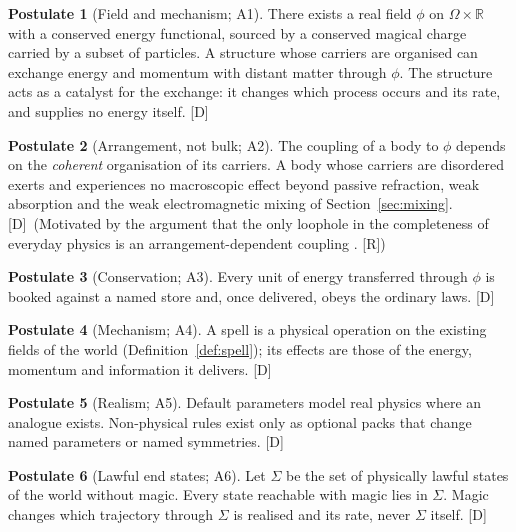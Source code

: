 \documentclass[11pt,a4paper]{article}
\numberwithin{equation}{section}
\theoremstyle{definition}
\newtheorem{postulate}{Postulate}
\theoremstyle{plain}
\theoremstyle{remark}
\newcommand{\R}{\mathbb R}
\newcommand{\tagD}{\textcolor{tag}{\textsf{[D]}}}
\newcommand{\tagR}{\textcolor{tag}{\textsf{[R]}}}
\begin{document}
\begin{postulate}[Field and mechanism; A1]\label{post:field}
There exists a real field $\phi$ on $\Omega\times\R$ with a conserved energy functional, sourced by a conserved magical charge carried by a subset of particles. A structure whose carriers are organised can exchange energy and momentum with distant matter through $\phi$. The structure acts as a catalyst for the exchange: it changes which process occurs and its rate, and supplies no energy itself. \tagD
\end{postulate}

\begin{postulate}[Arrangement, not bulk; A2]\label{post:arrangement}
The coupling of a body to $\phi$ depends on the \emph{coherent} organisation of its carriers. A body whose carriers are disordered exerts and experiences no macroscopic effect beyond passive refraction, weak absorption and the weak electromagnetic mixing of Section~\ref{sec:mixing}. \tagD\ (Motivated by the argument that the only loophole in the completeness of everyday physics is an arrangement-dependent coupling \cite{carroll}. \tagR)
\end{postulate}

\begin{postulate}[Conservation; A3]\label{post:conservation}
Every unit of energy transferred through $\phi$ is booked against a named store and, once delivered, obeys the ordinary laws. \tagD
\end{postulate}

\begin{postulate}[Mechanism; A4]\label{post:mechanism}
A spell is a physical operation on the existing fields of the world (Definition~\ref{def:spell}); its effects are those of the energy, momentum and information it delivers. \tagD
\end{postulate}

\begin{postulate}[Realism; A5]\label{post:realism}
Default parameters model real physics where an analogue exists. Non-physical rules exist only as optional packs that change named parameters or named symmetries. \tagD
\end{postulate}

\begin{postulate}[Lawful end states; A6]\label{post:lawful}
Let $\Sigma$ be the set of physically lawful states of the world without magic. Every state reachable with magic lies in $\Sigma$. Magic changes which trajectory through $\Sigma$ is realised and its rate, never $\Sigma$ itself. \tagD
\end{postulate}
\end{document}
